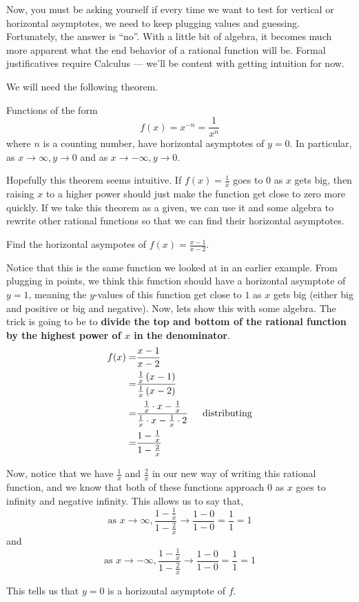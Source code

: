 \documentclass{ximera}
\begin{document}
Now, you must be asking yourself if every time we want to test for vertical or horizontal asymptotes, we need to keep plugging values and guessing. Fortunately, the answer is ``no''.   With a little bit of algebra, it becomes much more apparent what the end behavior of a rational function will be.  Formal justificatives require Calculus --- we'll be content with getting intuition for now.

We will need the following theorem.

\begin{theorem}
Functions of the form $$f(x)=x^{-n}=\frac{1}{x^n}$$ where $n$ is a counting number, have horizontal asymptotes of $y=0$.  In particular, as $x \rightarrow \infty, y \rightarrow 0$ and   as $x \rightarrow -\infty, y \rightarrow 0$.
\end{theorem}

Hopefully this theorem seems intuitive.  If $f(x)=\frac{1}{x}$ goes to 0 as $x$ gets big, then raising $x$ to a higher power should just make the function get close to zero more quickly.  If we take this theorem as a given, we can use it and some algebra to rewrite other rational functions so that we can find their horizontal asymptotes.

\begin{example}  Find the horizontal asympotes of $f(x) = \frac{x-1}{x-2}$.

\begin{explanation}
Notice that this is the same function we looked at in an earlier example.  From plugging in points, we think this function should have a horizontal asymptote of $y=1$, meaning the $y$-values of this function get close to $1$ as $x$ gets big (either big and positive or big and negative).  Now, lets show this with some algebra.  The trick is going to be to \textbf{divide the top and bottom of the rational function by the highest power of $x$ in the denominator}.
\begin{align*}
f(x) =& \frac{x-1}{x-2}\\
=& \frac{\frac{1}{x}\left(x-1\right)}{\frac{1}{x}\left(x-2\right)} \\
=& \frac{\frac{1}{x} \cdot x-\frac{1}{x}}{\frac{1}{x}\cdot x-\frac{1}{x} \cdot 2} \text{ \, \,\,    distributing} \\
=& \frac{1-\frac{1}{x}}{1-\frac{2}{x}} \\
\end{align*}

Now, notice that we have $\frac{1}{x}$ and $\frac{2}{x}$ in our new way of writing this rational function, and we know that both of these functions approach $0$ as $x$ goes to infinity and negative infinity.  This allows us to say  that,
\[
\text{as } x \rightarrow \infty, \frac{1-\frac{1}{x}}{1-\frac{2}{x}} \rightarrow \frac{1-0}{1-0}=\frac{1}{1}=1
\]
and
\[
\text{as } x \rightarrow -\infty, \frac{1-\frac{1}{x}}{1-\frac{2}{x}} \rightarrow \frac{1-0}{1-0}=\frac{1}{1}=1
\]

This tells us that $y=0$ is a horizontal asymptote of $f$.
\end{explanation}
\end{example}
\end{document}

